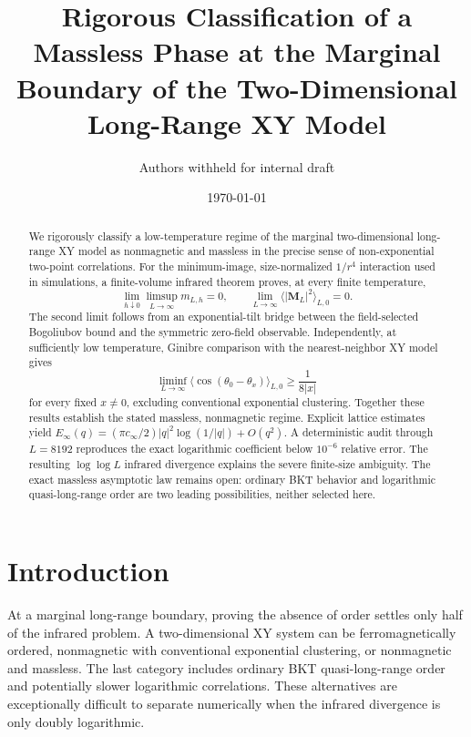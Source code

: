 \documentclass[aps,prb,twocolumn,groupedaddress,amsmath,amssymb,
               superscriptaddress,nofootinbib,floatfix]{revtex4-2}
\theoremstyle{plain}
\theoremstyle{definition}
\begin{document}
\title{Rigorous Classification of a Massless Phase at the Marginal Boundary
       of the Two-Dimensional Long-Range XY Model}

\author{Authors withheld for internal draft}
\date{\today}

\begin{abstract}
We rigorously classify a low-temperature regime of the marginal
two-dimensional long-range XY model as nonmagnetic and massless in the
precise sense of non-exponential two-point correlations.  For the
minimum-image, size-normalized $1/r^4$ interaction used in simulations, a
finite-volume infrared theorem proves, at every finite temperature,
\[
 \lim_{h\downarrow0}\limsup_{L\to\infty}m_{L,h}=0,
 \qquad
 \lim_{L\to\infty}\langle|\bm M_L|^2\rangle_{L,0}=0.
\]
The second limit follows from an exponential-tilt bridge between the
field-selected Bogoliubov bound and the symmetric zero-field observable.
Independently, at sufficiently low temperature, Ginibre comparison with the
nearest-neighbor XY model gives
\[
 \liminf_{L\to\infty}
 \langle\cos(\theta_0-\theta_x)\rangle_{L,0}
 \ge \frac{1}{8|x|}
\]
for every fixed $x\ne0$, excluding conventional exponential clustering.
Together these results establish the stated massless, nonmagnetic regime.
Explicit lattice estimates yield
$E_\infty(q)=(\pi c_\infty/2)|q|^2\log(1/|q|)+O(q^2)$.
A deterministic audit through $L=8192$ reproduces the exact logarithmic
coefficient below $10^{-6}$ relative error.  The resulting $\log\log L$
infrared divergence explains the severe finite-size ambiguity.  The exact
massless asymptotic law remains open: ordinary BKT behavior and logarithmic
quasi-long-range order are two leading possibilities, neither selected here.
\end{abstract}

\maketitle

\section{Introduction}

At a marginal long-range boundary, proving the absence of order settles only
half of the infrared problem.  A two-dimensional XY system can be
ferromagnetically ordered, nonmagnetic with conventional exponential
clustering, or nonmagnetic and massless.  The last category includes ordinary
BKT quasi-long-range order and potentially slower logarithmic correlations.
These alternatives are exceptionally difficult to separate numerically when
the infrared divergence is only doubly logarithmic.
\end{document}
